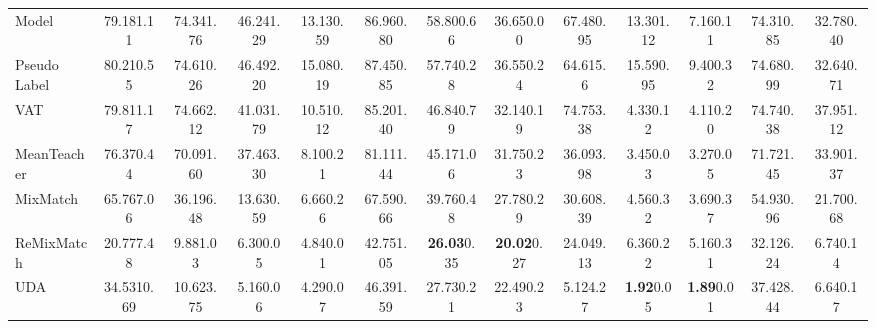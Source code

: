 \documentclass{article} \usepackage{iclr2023_conference,times}
\theoremstyle{plain}
\theoremstyle{definition}
\theoremstyle{remark}
\begin{document}
\begin{table}[!t]
{\begin{tabular}{l|cccc|ccc|ccc|cc}
 Model \citep{rasmus2015semi} & 79.18{\scriptsize 1.11} & 74.34{\scriptsize 1.76} & 46.24{\scriptsize 1.29} & 13.13{\scriptsize 0.59} & 86.96{\scriptsize 0.80} & 58.80{\scriptsize 0.66} & 36.65{\scriptsize 0.00} & 67.48{\scriptsize 0.95} & {13.30\scriptsize 1.12} & 7.16{\scriptsize 0.11}  & 74.31{\scriptsize 0.85} & 32.78{\scriptsize 0.40} \\
Pseudo Label \citep{lee2013pseudo} & 80.21{\scriptsize 0.55}& 74.61{\scriptsize 0.26}  & 46.49{\scriptsize 2.20} & 15.08{\scriptsize 0.19} & 87.45{\scriptsize 0.85} & 57.74{\scriptsize 0.28} & 36.55{\scriptsize 0.24} & 64.61{\scriptsize 5.6} & 15.59{\scriptsize 0.95}  & 9.40{\scriptsize 0.32}  & 74.68{\scriptsize 0.99} & 32.64{\scriptsize 0.71} \\
VAT \citep{miyato2018virtual} & 79.81{\scriptsize 1.17} & 74.66{\scriptsize 2.12} & 41.03{\scriptsize 1.79} & 10.51{\scriptsize 0.12} & 85.20{\scriptsize 1.40} & 46.84{\scriptsize 0.79} & 32.14{\scriptsize 0.19} & 74.75{\scriptsize 3.38} & 4.33{\scriptsize 0.12} & 4.11{\scriptsize 0.20} & 74.74{\scriptsize 0.38}  & 37.95{\scriptsize 1.12} \\
MeanTeacher \citep{tarvainen2017mean} & 76.37{\scriptsize 0.44} & 70.09{\scriptsize 1.60} & 37.46{\scriptsize 3.30} & 8.10{\scriptsize 0.21} & 81.11{\scriptsize 1.44} & 45.17{\scriptsize 1.06} & 31.75{\scriptsize 0.23} & 36.09{\scriptsize 3.98} & 3.45{\scriptsize 0.03} & 3.27{\scriptsize 0.05}  & 71.72{\scriptsize 1.45} & 33.90{\scriptsize 1.37} \\
 MixMatch \citep{berthelot2019mixmatch} & 65.76{\scriptsize 7.06} & 36.19{\scriptsize 6.48} & 13.63{\scriptsize 0.59} & 6.66{\scriptsize 0.26} & 67.59{\scriptsize 0.66} & 39.76{\scriptsize 0.48} & 27.78{\scriptsize 0.29} & 30.60{\scriptsize 8.39} & 4.56{\scriptsize 0.32} & 3.69{\scriptsize 0.37}  & 54.93{\scriptsize 0.96} & 21.70{\scriptsize 0.68} \\
 ReMixMatch \citep{berthelot2019remixmatch} & 20.77{\scriptsize 7.48} & 9.88{\scriptsize 1.03} & 6.30{\scriptsize 0.05} & 4.84{\scriptsize 0.01} & 42.75{\scriptsize 1.05} & \textbf{26.03}{\scriptsize 0.35} & \textbf{20.02}{\scriptsize 0.27} & 24.04{\scriptsize 9.13} & 6.36{\scriptsize 0.22}  & 5.16{\scriptsize 0.31} & 32.12{\scriptsize 6.24} & 6.74{\scriptsize 0.14} \\
 UDA \citep{xie2020unsupervised} & 34.53{\scriptsize 10.69} & 10.62{\scriptsize 3.75} & 5.16{\scriptsize 0.06} & 4.29{\scriptsize 0.07} & 46.39{\scriptsize 1.59} & 27.73{\scriptsize 0.21} & 22.49{\scriptsize 0.23} & 5.12{\scriptsize 4.27} & \textbf{1.92}{\scriptsize 0.05} & \textbf{1.89}{\scriptsize 0.01}  & 37.42{\scriptsize 8.44} & 6.64{\scriptsize 0.17} \\

\end{tabular}}
\end{table}
\end{document}
